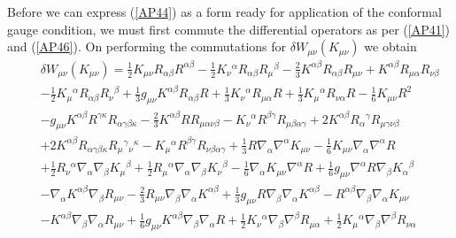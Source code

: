 Before we can express (\ref{AP44}) as a form ready for application of the conformal gauge condition, we must first commute the differential operators as per (\ref{AP41}) and (\ref{AP46}).  On performing the commutations for $\delta W_{\mu\nu}^{}(K_{\mu\nu})$ we obtain
%
\begin{eqnarray}
&&\delta W_{\mu\nu}^{}(K_{\mu\nu})=\tfrac{1}{2} K_{\mu \nu} R_{\alpha \beta} R^{\alpha \beta} -  \tfrac{1}{2} K_{\nu}{}^{\alpha} R_{\alpha \beta} R_{\mu}{}^{\beta} -  \tfrac{2}{3} K^{\alpha \beta} R_{\alpha \beta} R_{\mu \nu} + K^{\alpha \beta} R_{\mu \alpha} R_{\nu \beta}  
\nonumber\\
&&-  \tfrac{1}{2} K_{\mu}{}^{\alpha} R_{\alpha \beta} R_{\nu}{}^{\beta} + \tfrac{1}{3} g_{\mu \nu} K^{\alpha \beta} R_{\alpha \beta} R 
+ \tfrac{1}{3} K_{\nu}{}^{\alpha} R_{\mu \alpha} R + \tfrac{1}{3} K_{\mu}{}^{\alpha} R_{\nu \alpha} R -  \tfrac{1}{6} K_{\mu \nu} R^2  
\nonumber\\
&&-  g_{\mu \nu} K^{\alpha \beta} R^{\gamma \kappa} R_{\alpha \gamma \beta \kappa} -  \tfrac{2}{3} K^{\alpha \beta} R R_{\mu \alpha \nu \beta} -  K_{\nu}{}^{\alpha} R^{\beta \gamma} R_{\mu \beta \alpha \gamma} + 2 K^{\alpha \beta} R_{\alpha}{}^{\gamma} R_{\mu \gamma \nu \beta} 
\nonumber\\
&&+ 2 K^{\alpha \beta} R_{\alpha \gamma \beta \kappa} R_{\mu}{}^{\gamma}{}_{\nu}{}^{\kappa} -  K_{\mu}{}^{\alpha} R^{\beta \gamma} R_{\nu \beta \alpha \gamma} + \tfrac{1}{3} R \nabla_{\alpha}\nabla^{\alpha}K_{\mu \nu} -  \tfrac{1}{6} K_{\mu \nu} \nabla_{\alpha}\nabla^{\alpha}R  
\nonumber\\
&&+ \tfrac{1}{2} R_{\nu}{}^{\alpha} \nabla_{\alpha}\nabla_{\beta}K_{\mu}{}^{\beta} + \tfrac{1}{2} R_{\mu}{}^{\alpha} \nabla_{\alpha}\nabla_{\beta}K_{\nu}{}^{\beta} 
-  \tfrac{1}{6} \nabla_{\alpha}K_{\mu \nu} \nabla^{\alpha}R + \tfrac{1}{6} g_{\mu \nu} \nabla^{\alpha}R \nabla_{\beta}K_{\alpha}{}^{\beta} 
\nonumber\\
&& -  \nabla_{\alpha}K^{\alpha \beta} \nabla_{\beta}R_{\mu \nu} -  \tfrac{2}{3} R_{\mu \nu} \nabla_{\beta}\nabla_{\alpha}K^{\alpha \beta} + \tfrac{1}{3} g_{\mu \nu} R \nabla_{\beta}\nabla_{\alpha}K^{\alpha \beta} -  R^{\alpha \beta} \nabla_{\beta}\nabla_{\alpha}K_{\mu \nu} 
\nonumber\\
&&-  K^{\alpha \beta} \nabla_{\beta}\nabla_{\alpha}R_{\mu \nu} + \tfrac{1}{6} g_{\mu \nu} K^{\alpha \beta} \nabla_{\beta}\nabla_{\alpha}R + \tfrac{1}{2} K_{\nu}{}^{\alpha} \nabla_{\beta}\nabla^{\beta}R_{\mu \alpha} + \tfrac{1}{2} K_{\mu}{}^{\alpha} \nabla_{\beta}\nabla^{\beta}R_{\nu \alpha}  

\end{eqnarray}
